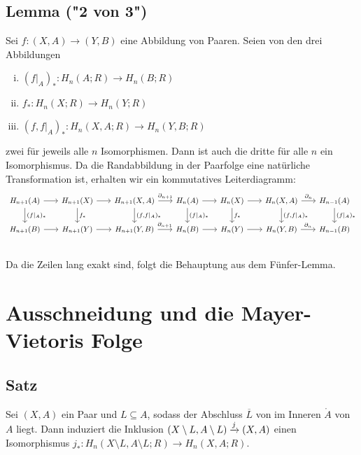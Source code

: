 \subsection{Lemma ("2 von 3")} %
\label{sub:816}
Sei $f \colon (X,A) \to (Y,B)$ eine Abbildung von Paaren. Seien von den drei Abbildungen
\begin{enumerate}[(i)]
	\item $(f|_A)_* \colon  H_n(A;R) \to H_n(B;R)$
	\item $f_* \colon H_n(X;R) \to H_n(Y;R)$
	\item $(f,f|_A)_* \colon H_n(X,A;R) \to H_n(Y,B;R)$
\end{enumerate}
zwei für jeweils alle $n$ Isomorphismen. Dann ist auch die dritte für alle $n$ ein Isomorphismus.
Da die Randabbildung in der Paarfolge eine natürliche Transformation ist, erhalten wir ein kommutatives Leiterdiagramm:
\[
	\begin{tikzcd}[column sep=1.7em, font=\small]
		H_{n+1}(A) \rar \dar["{(f|_A)_*}"] & H_{n+1}(X) \rar \dar["f_*"] & H_{n+1}(X,A) \rar["\partial_{n+1}"] \dar["{(f,f|_A)_*}"] & H_n(A) \rar \dar["(f|_A)_*"] & H_n(X) \rar \dar["f_*"] & H_n(X,A) \rar["\partial_n"] \dar["{(f,f|_A)_*}"] & H_{n-1}(A) \dar["{(f|_A)_*}"] \\
		H_{n+1}(B) \rar & H_{n+1}(Y) \rar & H_{n+1}(Y,B) \rar["\partial_{n+1}"] & H_n(B) \rar & H_n(Y) \rar & H_n(Y,B) \rar["\partial_n"] & H_{n-1}(B) \\
	\end{tikzcd}
\]
Da die Zeilen lang exakt sind, folgt die Behauptung aus dem Fünfer-Lemma. \bewende
\newpage

\section{Ausschneidung und die Mayer-Vietoris Folge} %
\label{sec:9}

\subsection[Satz: Ausschneidungsisomorphismus]{Satz} %
\label{sub:91}
Sei $(X,A)$ ein Paar und $L \subseteq A$, sodass der Abschluss $\overline{L}$ von im Inneren $\mathring{A}$ von $A$ liegt. Dann induziert die Inklusion
$\enbrace*{X \setminus L, A \setminus L} \xrightarrow{j} (X,A)$ einen Isomorphismus $j_* \colon H_n(X \setminus L, A \setminus L;R) \to H_n(X,A;R)$.

